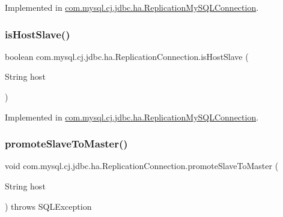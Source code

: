 Implemented in \mbox{\hyperlink{classcom_1_1mysql_1_1cj_1_1jdbc_1_1ha_1_1_replication_my_s_q_l_connection_af096f43b025284f2679e1965fd4fd230}{com.\+mysql.\+cj.\+jdbc.\+ha.\+Replication\+My\+S\+Q\+L\+Connection}}.

\mbox{\label{interfacecom_1_1mysql_1_1cj_1_1jdbc_1_1ha_1_1_replication_connection_acd55ae42ba3c57522fc995a80da26675}} 
\subsubsection{\texorpdfstring{is\+Host\+Slave()}{isHostSlave()}}
{\footnotesize\ttfamily boolean com.\+mysql.\+cj.\+jdbc.\+ha.\+Replication\+Connection.\+is\+Host\+Slave (\begin{DoxyParamCaption}\item[{String}]{host }\end{DoxyParamCaption})}



Implemented in \mbox{\hyperlink{classcom_1_1mysql_1_1cj_1_1jdbc_1_1ha_1_1_replication_my_s_q_l_connection_a55c6af349813e6a4b4527207647beadb}{com.\+mysql.\+cj.\+jdbc.\+ha.\+Replication\+My\+S\+Q\+L\+Connection}}.

\mbox{\label{interfacecom_1_1mysql_1_1cj_1_1jdbc_1_1ha_1_1_replication_connection_abeccff634ae5dc9f96295b012c458500}} 
\subsubsection{\texorpdfstring{promote\+Slave\+To\+Master()}{promoteSlaveToMaster()}}
{\footnotesize\ttfamily void com.\+mysql.\+cj.\+jdbc.\+ha.\+Replication\+Connection.\+promote\+Slave\+To\+Master (\begin{DoxyParamCaption}\item[{String}]{host }\end{DoxyParamCaption}) throws S\+Q\+L\+Exception}



